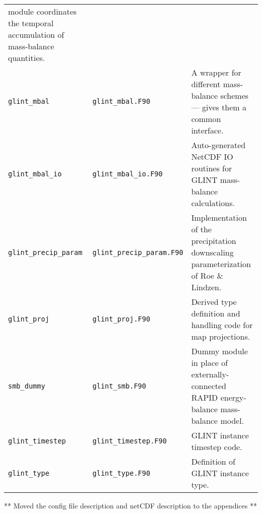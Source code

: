 \begin{center}
\begin{supertabular}{|l|l|p{7cm}|}
    module coordinates the temporal accumulation of mass-balance quantities.\\
    \texttt{glint\_mbal} & \texttt{glint\_mbal.F90} & A wrapper for different
    mass-balance schemes --- gives them a common interface. \\
    \texttt{glint\_mbal\_io} & \texttt{glint\_mbal\_io.F90} & Auto-generated
    NetCDF IO routines for GLINT mass-balance calculations. \\
    \texttt{glint\_precip\_param} & \texttt{glint\_precip\_param.F90} & Implementation of the
    precipitation downscaling parameterization of Roe \& Lindzen. \\
    \texttt{glint\_proj} & \texttt{glint\_proj.F90} & Derived type definition
    and handling code for map projections. \\
    \texttt{smb\_dummy} & \texttt{glint\_smb.F90} & Dummy module in place of
    externally-connected RAPID energy-balance mass-balance model. \\
    \texttt{glint\_timestep} & \texttt{glint\_timestep.F90} & GLINT instance
    timestep code. \\
    \texttt{glint\_type} & \texttt{glint\_type.F90} & Definition of GLINT
    instance type. \\
  \end{supertabular}
\end{center}



** Moved the config file description and netCDF description to the appendices **
%
%
